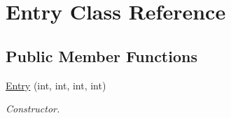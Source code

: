 \hypertarget{classEntry}{\section{\-Entry \-Class \-Reference}
\label{classEntry}
}
\subsection*{\-Public \-Member \-Functions}
\begin{DoxyCompactItemize}
\item 
\hypertarget{classEntry_abf8ba7e2c8358cc37d816d5b6b00bee9}{\hyperlink{classEntry_abf8ba7e2c8358cc37d816d5b6b00bee9}{\-Entry} (int, int, int, int)}\label{classEntry_abf8ba7e2c8358cc37d816d5b6b00bee9}

\begin{DoxyCompactList}\small\item\em \-Constructor. \end{DoxyCompactList}\end{DoxyCompactItemize}
